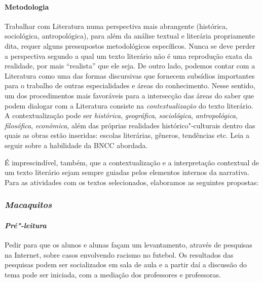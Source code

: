 \documentclass[11pt]{extarticle}
\begin{document}
\paragraph{Metodologia} Trabalhar com Literatura numa perspectiva mais
abrangente (histórica, sociológica, antropológica), para além da análise
textual e literária propriamente dita, requer alguns pressupostos
metodológicos específicos. Nunca se deve perder a perspectiva segundo a
qual um texto literário não é uma reprodução exata da realidade, por
mais ``realista'' que ele seja. De outro lado, podemos contar com a
Literatura como uma das formas discursivas que fornecem subsídios
importantes para o trabalho de outras especialidades e áreas do
conhecimento. Nesse sentido, um dos procedimentos mais favoráveis para a
intersecção das áreas do saber que podem dialogar com a Literatura
consiste na \emph{contextualização} do texto literário. A
contextualização pode ser \emph{histórica}, \emph{geográfica},
\emph{sociológica}, \emph{antropológica}, \emph{filosófica},
\emph{econômica,} além das próprias realidades histórico"-culturais
dentro das quais as obras estão inseridas: escolas literárias, gêneros,
tendências etc.
Leia a seguir sobre a habilidade da BNCC abordada.

É imprescindível, também, que a contextualização e a
interpretação contextual de um texto literário sejam sempre guiadas
pelos elementos internos da narrativa. Para as atividades com os textos
selecionados, elaboramos as seguintes propostas:

\subsubsection{\textit{Macaquitos}}

\paragraph{\textit{Pré"-leitura }}

Pedir para que os alunos e alunas façam um levantamento, através de
pesquisas na Internet, sobre casos envolvendo racismo no futebol. Os
resultados das pesquisas podem ser socializados em sala de aula e a
partir daí a discussão do tema pode ser iniciada, com a mediação dos
professores e professoras.
\end{document}
